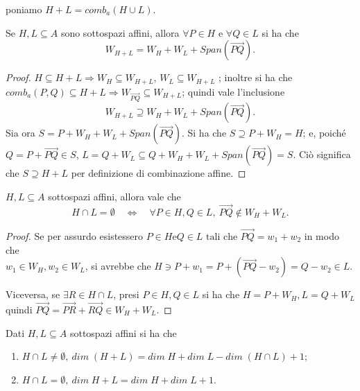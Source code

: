 \documentclass[a4paper,12pt]{article}
\newcommand{\Got}[1]{#1}
\newcommand{\got}[1]{{#1}}
\newcommand{\vet}[1]{\overrightarrow{#1}}
\begin{document}
 \begin{notazione}
	\Got{poniamo} $\got{H+L = comb_a(H\cup L)}$.
 \end{notazione}
 
 \begin{proposition}[Giacitura di $\got{H+L}$] \Got{Se} $\got{H,L\subseteq A}$ \Got{sono sottospazi affini, allora}
 $\got{\forall P\in H}$ \Got{e} $\got{\forall Q \in L}$ \Got{si ha che}
 \[
	\got{W_{H+L}=W_H+W_L+Span(\vet{PQ})}.
 \]
 \end{proposition}

 \begin{proof}
 \Got{} $\got{H\subseteq H+L \Rightarrow W_H \subseteq W_{H+L}}$, $\got{W_L \subseteq W_{H+L}}$ \Got{; inoltre si ha che}\\
 $\got{comb_a(P,Q)\subseteq H+L \Rightarrow W_{\vet{PQ}}\subseteq W_{H+L}}$; \Got{quindi vale l'inclusione}
 \[
	\got{W_{H+L}\supseteq W_H+W_L+Span(\vet{PQ})}.
 \]
 \Got{Sia ora} $\got{S=P+W_H+W_L+Span(\vet{PQ})}$. \Got{Si ha che} $\got{S\supseteq P+W_H = H}$; \Got{e, poiché} $\got{Q= P+ \vet{PQ}\in S}$,
 $\got{L=Q+W_L \subseteq Q+W_H+W_L+Span(\vet{PQ})=S}$. \Got{Ciò significa che} $\got{S\supseteq H+L}$ \Got{per definizione di combinazione
 affine.}
 \end{proof}
 
 \begin{lemma}
 \Got{} $\got{H,L\subseteq A}$ \Got{sottospazi affini, allora vale che}
 \[
	\got{H\cap L = \emptyset\quad \Leftrightarrow\quad \forall P\in H, Q \in L,\ \vet{PQ}\notin W_H+W_L.}
 \]
 \end{lemma}
 
 \begin{proof}
 \Got{Se per assurdo esistessero} $\got{P\in H \text{e} Q\in L \text{ tali che } \vet{PQ}=w_1+w_2}$ \Got{in modo che}\\
 $\got{w_1\in W_H, w_2\in W_L}$, \Got{si avrebbe che} $\got{H \ni P+w_1 = P+(\vet{PQ}-w_2) = Q - w_2 \in L.}$
 
 \Got{Viceversa, se} $\got{\exists R \in H \cap L}$, \Got{presi} $\got{P\in H, Q \in L}$ \Got{si ha che} $\got{H=P+W_H,L=Q+W_L}$ \Got{quindi}
 $\got{\vet{PQ}=\vet{PR}+\vet{RQ}\in W_H+W_L}$.
 \end{proof}
 
 \begin{proposition}
\Got{Dati} $\got{H,L\subseteq A}$ \Got{sottospazi affini si ha che}
 \begin{enumerate}[label=\bf\Roman*)]
	\item $\got{H\cap L \neq \emptyset, \ dim\;(H+L)=dim\;H+dim\;L-dim\;(H\cap L)+1}$;\label{GrassAffnote}
	\item $\got{H\cap L = \emptyset, \ dim\;{H+L}=dim\;H+dim\;L+1}$.\label{GrassAffemp}
 \end{enumerate}
 \end{proposition}
 
\end{document}
